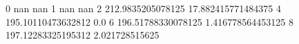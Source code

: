 0 nan nan
1 nan nan
2 212.9835205078125 17.882415771484375
4 195.10110473632812 0.0
6 196.51788330078125 1.416778564453125
8 197.12283325195312 2.021728515625
